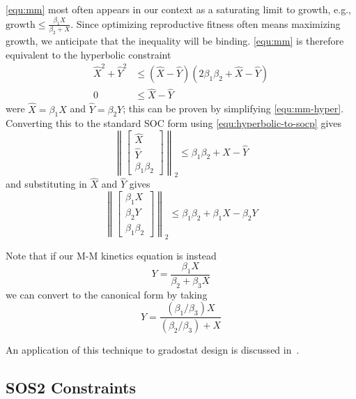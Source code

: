 \documentclass{article}
\begin{document}
\autoref{equ:mm} most often appears in our context as a saturating limit to growth, e.g., $\textrm{growth}\le\frac{\beta_1 X}{\beta_2 + X}$. Since optimizing reproductive fitness often means maximizing growth, we anticipate that the inequality will be binding. \autoref{equ:mm} is therefore equivalent to the hyperbolic constraint
\begin{align}
\label{equ:mm-hyper}
\hat{X}^2+\hat{Y}^2 &\le (\hat{X}-\hat{Y})(2\beta_1\beta_2+\hat{X}-\hat{Y}) \\
   0    &\le \hat{X}-\hat{Y}
\end{align}
were $\hat{X}=\beta_1 X$ and $\hat{Y}=\beta_2Y$; this can be proven by simplifying \autoref{equ:mm-hyper}. Converting this to the standard SOC form using \autoref{equ:hyperbolic-to-socp} gives
\begin{equation}
\left\lVert \begin{bmatrix} \hat{X} \\ \hat{Y} \\ \beta_1\beta_2 \end{bmatrix} \right\rVert_2 \le \beta_1\beta_2 + \hat{X} - \hat{Y}
\end{equation}
and substituting in $\hat{X}$ and $\hat{Y}$ gives
\begin{equation}
\left\lVert \begin{bmatrix} \beta_1 X \\ \beta_2 Y \\ \beta_1\beta_2 \end{bmatrix} \right\rVert_2 \le \beta_1\beta_2 + \beta_1 X - \beta_2 Y
\end{equation}

Note that if our M-M kinetics equation is instead
\begin{equation}
  Y = \frac{\beta_1 X}{\beta_2 + \beta_3 X}
\end{equation}
we can convert to the canonical form by taking
\begin{equation}
  Y = \frac{(\beta_1/\beta_3) X}{(\beta_2/\beta_3) + X}
\end{equation}

An application of this technique to gradostat design is discussed in~\citep{Taylor2021}.



\subsection{SOS2 Constraints}
\label{sec:sos2}
\end{document}
